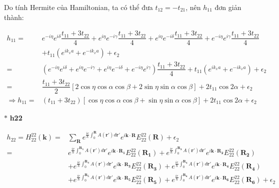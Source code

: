 \documentclass{report}
\begin{document}
Do tính Hermite của Hamiltonian, ta có thể đưa $t_{12} = - t_{21}$, nên
$h_{11}$ đơn giản thành:

\begin{align*}
	h_{11} =            & e^{-i\eta} e^{i\delta} \dfrac{t_{11} + 3t_{22}}{4} + e^{i\eta} e^{-i\gamma} \dfrac{t_{11} + 3t_{22}}{4} + e^{i\eta} e^{-i\delta} \dfrac{t_{11} + 3t_{22}}{4} + e^{-i\eta} e^{i\gamma} \dfrac{t_{11} + 3t_{22}}{4} \\
	                    & + t_{11}\left( e^{ik_x a} + e^{-ik_x a} \right) + \epsilon_2                                                                                                                                                      \\
	=                   & ( e^{-i\eta} e^{i\delta} + e^{i\eta} e^{-i\gamma} + e^{i\eta} e^{-i\delta} + e^{-i\eta} e^{i\gamma} ) \dfrac{t_{11} + 3t_{22}}{4} + t_{11}\left( e^{ik_x a} + e^{-ik_x a} \right) + \epsilon_2                    \\
	=                   & \dfrac{t_{11} + 3t_{22}}{2} \left[ 2\cos\eta\cos\alpha\cos\beta + 2\sin\eta\sin\alpha\cos\beta \right] + 2t_{11}\cos2\alpha + \epsilon_2                                                                          \\
	\Rightarrow h_{11}= & (t_{11} + 3t_{22}) \left[ \cos\eta\cos\alpha\cos\beta + \sin\eta\sin\alpha\cos\beta \right] + 2t_{11}\cos2\alpha + \epsilon_2
\end{align*}

$\ast$ \textbf{h22}

\begin{align*}
	h_{22} = H_{22}^{22}(\textbf{k})  = & \sum_{\textbf{R}} e^{\frac{ie}{\hbar}\int_{0}^{\mathbf{R}}A(\mathbf{r'})d\mathbf{r'}}e^{i\mathbf{k\cdot R}} E_{22}^{22}(\mathbf{R}) + \epsilon_2                                                                                                                 \\
	=                                   & e^{\frac{ie}{\hbar}\int_{0}^{\mathbf{R_1}}A(\mathbf{r'})d\mathbf{r'}}e^{i\mathbf{k\cdot R_1}} E_{22}^{22}(\mathbf{R_1}) + e^{\frac{ie}{\hbar}\int_{0}^{\mathbf{R_2}}A(\mathbf{r'})d\mathbf{r'}}e^{i\mathbf{k\cdot R_2}} E_{22}^{22}(\mathbf{R_2})                \\
	                                    & + e^{\frac{ie}{\hbar}\int_{0}^{\mathbf{R_3}}A(\mathbf{r'})d\mathbf{r'}}e^{i\mathbf{k\cdot R_3}} E_{22}^{22}(\mathbf{R_3}) + e^{\frac{ie}{\hbar}\int_{0}^{\mathbf{R_4}}A(\mathbf{r'})d\mathbf{r'}}e^{i\mathbf{k\cdot R_4}} E_{22}^{22}(\mathbf{R_4})              \\
	                                    & + e^{\frac{ie}{\hbar}\int_{0}^{\mathbf{R_5}}A(\mathbf{r'})d\mathbf{r'}}e^{i\mathbf{k\cdot R_5}} E_{22}^{22}(\mathbf{R_5}) + e^{\frac{ie}{\hbar}\int_{0}^{\mathbf{R_6}}A(\mathbf{r'})d\mathbf{r'}}e^{i\mathbf{k\cdot R_6}} E_{22}^{22}(\mathbf{R_6}) + \epsilon_2
\end{align*}
\end{document}
